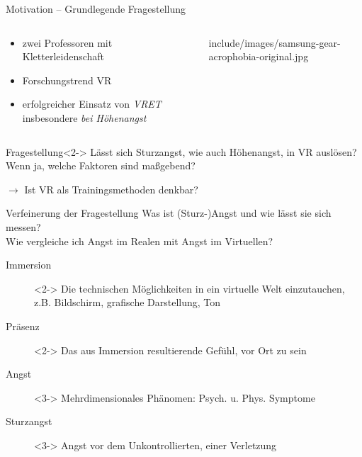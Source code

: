 \begin{frame}{Motivation -- Grundlegende Fragestellung}
\begin{columns}
	\begin{column}{0.48\textwidth}
		\begin{itemize}[label=\textcolor{tracker}{\textbullet}]
			\item zwei Professoren mit Kletterleidenschaft
			\item Forschungstrend \gls{VR}
			\item erfolgreicher Einsatz von \textit{\gls{VRET}} insbesondere \textit{bei Höhenangst} \autocite{Emmelkamp2001}
		\end{itemize}
	\end{column}
	\begin{column}{0.44\textwidth}
		\vfill
		\hfill
		\begin{overpic}[width=0.9\columnwidth]{include/images/samsung-gear-acrophobia-original.jpg}
		\end{overpic}
	\end{column}
\end{columns}
\vfill
{}
\begin{block}{Fragestellung}<2->
	Lässt sich \textcolor{tracker}{Sturzangst}, wie auch Höhenangst, \textcolor{tracker}{in \gls{VR} auslösen?}\\Wenn ja, welche Faktoren sind maßgebend?
	
	\hfill $\rightarrow$ Ist \gls{VR} als Trainingsmethoden denkbar?
\end{block}
\end{frame}

\begin{frame}{Verfeinerung der Fragestellung}
Was ist (Sturz-)Angst und wie lässt sie sich messen?\\Wie vergleiche ich Angst im Realen mit Angst im Virtuellen?
\begin{description}
\item[Immersion]<2-> Die technischen Möglichkeiten in ein virtuelle Welt einzutauchen,\\z.B. Bildschirm, grafische Darstellung, Ton \autocite{McMahan2003}
\item[Präsenz]<2-> Das aus Immersion resultierende Gefühl, vor Ort zu sein \autocite{McMahan2003}
\item[Angst]<3-> Mehrdimensionales Phänomen: Psych. u. Phys. Symptome \autocite{Krohne1996}
\item[Sturzangst]<3-> Angst vor dem Unkontrollierten, einer Verletzung \autocite{Lewis2010}
\end{description}
\begin{center}
\end{center}
\end{frame}

